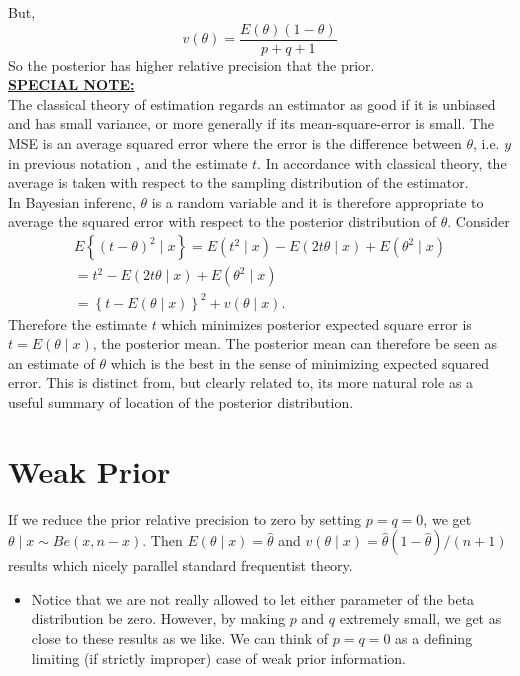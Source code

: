 \documentclass[lecture,12pt,]{pcms-l}
\numberwithin{section}{chapter}
\numberwithin{equation}{chapter}
\theoremstyle{plain}
\theoremstyle{definition}
\theoremstyle{definition}
\begin{document}
But,
\begin{equation}
v(\theta)=\frac{E(\theta)(1-\theta)}{p+q+1}
\end{equation}
So the posterior has higher relative precision that the prior.
\\
\underline{\bf{SPECIAL NOTE:}}
\\
The classical theory of estimation regards an estimator as good if it is unbiased and has small variance, or more generally if its mean-square-error is small. The MSE is an average squared error where the error is the difference between $\theta$, i.e. $y$ in previous notation , and the estimate $t$. In accordance with classical theory, the average is taken with respect to the sampling distribution of the estimator.
\\
In Bayesian inferenc, $\theta$ is a random variable and it is therefore appropriate to average the squared error with respect to the posterior distribution of $\theta$. Consider
\begin{equation}
\begin{split}
E\left \{ (t -\theta)^2 \mid x \right \}=E(t^2 \mid x)- E(2 t \theta \mid x)+ E(\theta^2 \mid x)
\\
= t^2 - E(2 t \theta \mid x)+ E(\theta^2 \mid x)
\\
=\left \{ t - E(\theta \mid x)\right \}^2+v(\theta \mid x).
\end{split}
\end{equation} 
Therefore the estimate $t$ which minimizes posterior expected square error is $t=E(\theta \mid x)$, the posterior mean. The posterior mean can therefore be seen as an estimate of $\theta$ which is the best in the sense of minimizing expected squared error. This is distinct from, but clearly related to, its more natural role as a useful summary of location of the posterior distribution. 
\section{Weak Prior}
If we reduce the prior relative precision to zero by setting $p=q=0$, we get $\theta \mid x \sim Be(x,n-x)$. Then $E(\theta \mid x)=\hat{\theta}$ and $v(\theta \mid x)=\hat{\theta}(1-\hat{\theta})/(n+1)$ results which nicely parallel standard frequentist theory.
\begin{itemize}
\item Notice that we are not really allowed to let either parameter of the beta distribution be zero. However, by making $p$ and $q$ extremely small, we get as close to these results as we like. We can think of $p=q=0$ as a defining limiting (if strictly improper) case of weak prior information.
\end{itemize}
\end{document}
